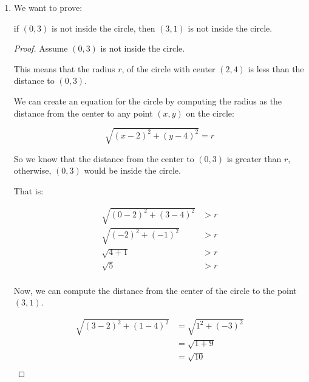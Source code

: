 \documentclass[12pt,letterpaper]{article}
\begin{document}
\begin{enumerate}
\begin{enumerate}
\begin{enumerate}
\begin{proof}
                Then our assumption must have been incorrect,
                and the original statement must in fact be true.

                Thus,
                if the radius is less than 5,
                then the circle does not intersect the line $y = x - 6$.
              \end{proof}
            \item
              We want to prove:

              if $(0, 3)$ is not inside the circle,
              then $(3, 1)$ is not inside the circle.

              \begin{proof}
                Assume $(0, 3)$ is not inside the circle.

                This means that the radius $r$, of the circle with center $(2, 4)$ is less than the distance to $(0, 3)$.

                We can create an equation for the circle by computing the radius as the distance from the center to any point $(x, y)$ on the circle:

                \[
                  \sqrt{(x - 2)^2 + (y - 4)^2} = r
                \]

                So we know that the distance from the center to $(0, 3)$ is greater than $r$,
                otherwise, $(0, 3)$ would be inside the circle.

                That is:

                \begin{align*}
                  \sqrt{(0 - 2)^2 + (3 - 4)^2} &> r \\
                  \sqrt{(- 2)^2 + (-1)^2} &> r \\
                  \sqrt{4 + 1} &> r \\
                  \sqrt{5} &> r \\
                \end{align*}

                Now, we can compute the distance from the center of the circle to the point $(3, 1)$.

                \begin{align*}
                  \sqrt{(3 - 2)^2 + (1 - 4)^2} &= \sqrt{1^2 + (-3)^2} \\
                  &= \sqrt{1 + 9} \\
                  &= \sqrt{10} \\
                \end{align*}


\end{proof}
\end{enumerate}
\end{enumerate}
\end{enumerate}
\end{document}
